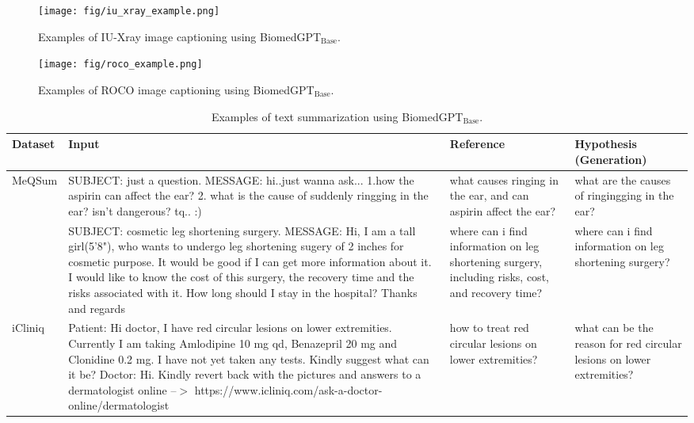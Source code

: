 \documentclass[10pt]{article} \usepackage[preprint]{tmlr}
\begin{document}
\clearpage
\begin{figure*}
    \centering
    \texttt{[image: fig/iu\_xray\_example.png]}
    \caption{Examples of IU-Xray image captioning using BiomedGPT$_{\text{Base}}$.}
    \label{fig:example_iu_xray}
\end{figure*}

\clearpage
\begin{figure*}
    \centering
    \texttt{[image: fig/roco\_example.png]}
    \caption{Examples of ROCO image captioning using BiomedGPT$_{\text{Base}}$.}
    \label{fig:example_roco}
\end{figure*}

\clearpage
\begin{table*}
    \centering
    \small
    \caption{Examples of text summarization using BiomedGPT$_{\text{Base}}$.} \label{tab:example_summary}
    \begin{tabularx}{\textwidth}{|>{\raggedright\arraybackslash}p{0.7in}|>{\raggedright\arraybackslash}X|>{\raggedright\arraybackslash}p{1.2in}|>{\raggedright\arraybackslash}p{1.2in}|}
    \hline
    \textbf{Dataset} & \textbf{Input} & \textbf{Reference} & \textbf{Hypothesis (Generation)} \\
    \hline
    MeQSum & SUBJECT: just a question. MESSAGE: hi..just wanna ask... 1.how the aspirin can affect the ear? 2. what is the cause of suddenly ringging in the ear? isn't dangerous? tq.. :) & what causes ringing in the ear, and can aspirin affect the ear? & what are the causes of ringingging in the ear? \\
    \cline{2-4}
     & SUBJECT: cosmetic leg shortening surgery. MESSAGE: Hi,  I am a tall girl(5'8"), who wants to undergo leg shortening sugery of 2 inches for cosmetic purpose. It would be good if I can get more information about it. I would like to know the cost of this surgery, the recovery time and the risks associated with it. How long should I stay in the hospital?  Thanks and regards & where can i find information on leg shortening surgery, including risks, cost, and recovery time? & where can i find information on leg shortening surgery? \\
    \hline
    iCliniq & Patient: Hi doctor, I have red circular lesions on lower extremities. Currently I am taking Amlodipine 10 mg qd, Benazepril 20 mg and Clonidine 0.2 mg. I have not yet taken any tests. Kindly suggest what can it be? Doctor: Hi. Kindly revert back with the pictures and answers to a dermatologist online --$>$ https://www.icliniq.com/ask-a-doctor-online/dermatologist & how to treat red circular lesions on lower extremities? & what can be the reason for red circular lesions on lower extremities? \\

\end{tabularx}
\end{table*}
\end{document}
